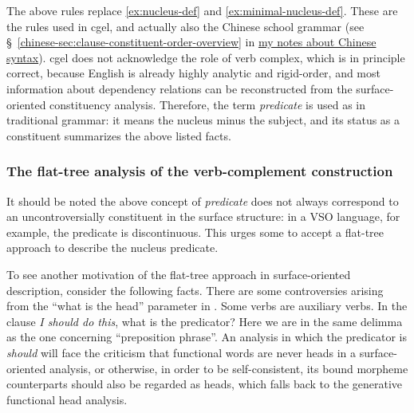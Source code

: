 \documentclass{article}
\newcommand*{\citesec}[1]{\S~{#1}}
\newcommand*{\term}[1]{\emph{#1}}
\newcommand*{\corpus}[1]{\emph{#1}}
\newcommand{\chinese}{\href{../Chinese/main.pdf}{my notes about Chinese syntax}}
\begin{document}
The above rules replace \eqref{ex:nucleus-def} and \eqref{ex:minimal-nucleus-def}.
These are the rules used in \ac{cgel}, and actually also the Chinese school grammar
(see \citesec{\ref{chinese-sec:clause-constituent-order-overview}} in \chinese).
\ac{cgel} does not acknowledge the role of verb complex,
which is in principle correct, 
because English is already highly analytic and rigid-order,
and most information about dependency relations can be reconstructed 
from the surface-oriented constituency analysis.
Therefore, the term \term{predicate} is used as in traditional grammar:
it means the nucleus minus the subject, 
and its status as a constituent summarizes the above listed facts.

\subsubsection{The flat-tree analysis of the verb-complement construction}

It should be noted the above concept of \term{predicate} does not always correspond to 
an uncontroversially constituent in the surface structure:
in a VSO language, for example, the predicate is discontinuous.
This urges some to accept a flat-tree approach to describe the nucleus predicate.

To see another motivation of the flat-tree approach in surface-oriented description, consider the following facts.
There are some controversies arising from the ``what is the head'' parameter in .
Some verbs are auxiliary verbs.
In the clause \corpus{I should do this},
what is the predicator?
Here we are in the same delimma as the one concerning ``preposition phrase''.
An analysis in which the predicator is \corpus{should} will face the criticism 
that functional words are never heads in a surface-oriented analysis,
or otherwise, in order to be self-consistent,
its bound morpheme counterparts should also be regarded as heads,
which falls back to the generative functional head analysis.
\end{document}
